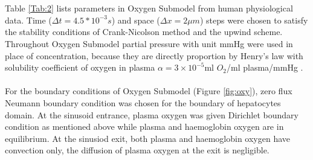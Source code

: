 \documentclass[12pt]{article}
\begin{document}
\\\\Table \ref{Tab:2} lists parameters in Oxygen Submodel from human physiological data. Time ($\Delta t=4.5*10^{-3}s$) and space ($\Delta x=2 \mu m$) steps were chosen to satisfy the stability conditions of Crank-Nicolson method and the upwind scheme.
Throughout Oxygen Submodel partial pressure with unit mmHg were used in place of concentration, because they are directly proportion by Henry's law
with solubility coefficient of oxygen in plasma $\alpha=3\times10^{-5}$ml $O_2$/ml plasma/mmHg \cite{pittmanOxygenTransport2011}.\\\\
For the boundary conditions of Oxygen Submodel (Figure \ref{fig:oxy}), zero flux Neumann boundary condition was chosen for the boundary of hepatocytes domain. At the sinusoid entrance, plasma oxygen was given Dirichlet boundary condition as mentioned above while plasma and haemoglobin oxygen are in equilibrium. At the sinusiod exit, both plasma and haemoglobin oxygen have convection only, the diffusion of plasma oxygen at the exit is negligible.\\\\
\end{document}
